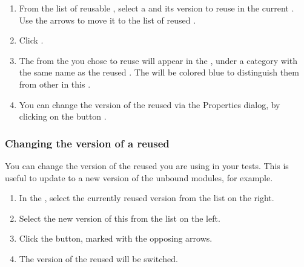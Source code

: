 \begin{enumerate}
\item From the list of reusable \gdprojects{}, select a \gdproject{} and its version to reuse in the current \gdproject{}. Use the arrows to move it to the list of reused \gdprojects{}.
\item Click . 
\item The \gdcases{} from the \gdproject{} you chose to reuse will appear in the \gdtestcasebrowser{}, under a category with the same name as the reused \gdproject{}. The \gdcases{} will be colored blue to distinguish them from other \gdcases{} in this \gdproject{}. 

\item You can change the version of the reused \gdproject{} via the  Properties dialog, by clicking on the  button .
\end{enumerate}

\subsubsection{Changing the version of a reused \gdproject{}}
\label{changingreusedprojectversion}
You can change the version of the reused \gdproject{} you are using in your tests. This is useful to update to a new version of the unbound modules, for example. 
\begin{enumerate}
\item In the , select the currently reused \gdproject{} version from the list on the right. 
\item Select the new version of this \gdproject{} from the list on the left. 
\item Click the  button, marked with the opposing arrows. 
\item The version of the reused \gdproject{} will be switched. 
\end{enumerate}


